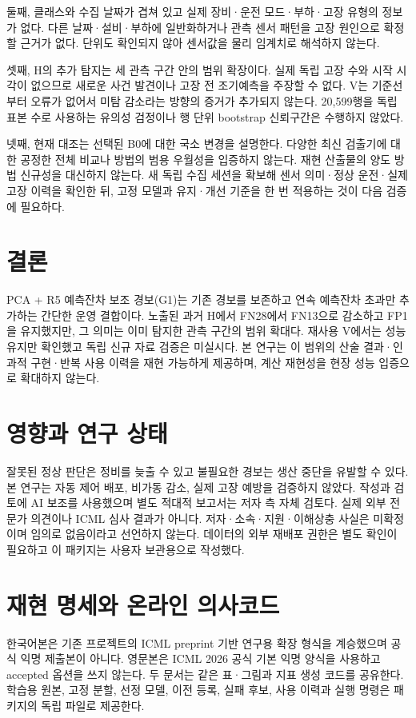\documentclass{article}
\begin{document}
둘째, 클래스와 수집 날짜가 겹쳐 있고 실제 장비·운전 모드·부하·고장 유형의 정보가 없다. 다른 날짜·설비·부하에 일반화하거나 관측 센서 패턴을 고장 원인으로 확정할 근거가 없다. 단위도 확인되지 않아 센서값을 물리 임계치로 해석하지 않는다.

셋째, H의 추가 탐지는 세 관측 구간 안의 범위 확장이다. 실제 독립 고장 수와 시작 시각이 없으므로 새로운 사건 발견이나 고장 전 조기예측을 주장할 수 없다. V는 기준선부터 오류가 없어서 미탐 감소라는 방향의 증거가 추가되지 않는다. 20,599행을 독립 표본 수로 사용하는 유의성 검정이나 행 단위 bootstrap 신뢰구간은 수행하지 않았다.

넷째, 현재 대조는 선택된 B0에 대한 국소 변경을 설명한다. 다양한 최신 검출기에 대한 공정한 전체 비교나 방법의 범용 우월성을 입증하지 않는다. 재현 산출물의 양도 방법 신규성을 대신하지 않는다. 새 독립 수집 세션을 확보해 센서 의미·정상 운전·실제 고장 이력을 확인한 뒤, 고정 모델과 유지·개선 기준을 한 번 적용하는 것이 다음 검증에 필요하다.

\section{결론}
PCA + R5 예측잔차 보조 경보(G1)는 기존 경보를 보존하고 연속 예측잔차 초과만 추가하는 간단한 운영 결합이다. 노출된 과거 H에서 FN28에서 FN13으로 감소하고 FP1을 유지했지만, 그 의미는 이미 탐지한 관측 구간의 범위 확대다. 재사용 V에서는 성능 유지만 확인했고 독립 신규 자료 검증은 미실시다. 본 연구는 이 범위의 산술 결과·인과적 구현·반복 사용 이력을 재현 가능하게 제공하며, 계산 재현성을 현장 성능 입증으로 확대하지 않는다.

\section*{영향과 연구 상태}
잘못된 정상 판단은 정비를 늦출 수 있고 불필요한 경보는 생산 중단을 유발할 수 있다. 본 연구는 자동 제어 배포, 비가동 감소, 실제 고장 예방을 검증하지 않았다. 작성과 검토에 AI 보조를 사용했으며 별도 적대적 보고서는 저자 측 자체 검토다. 실제 외부 전문가 의견이나 ICML 심사 결과가 아니다. 저자·소속·지원·이해상충 사실은 미확정이며 임의로 없음이라고 선언하지 않는다. 데이터의 외부 재배포 권한은 별도 확인이 필요하고 이 패키지는 사용자 보관용으로 작성했다.

\clearpage\appendix\onecolumn
\section{재현 명세와 온라인 의사코드}
한국어본은 기존 프로젝트의 ICML preprint 기반 연구용 확장 형식을 계승했으며 공식 익명 제출본이 아니다. 영문본은 ICML 2026 공식 기본 익명 양식을 사용하고 accepted 옵션을 쓰지 않는다. 두 문서는 같은 표·그림과 지표 생성 코드를 공유한다. 학습용 원본, 고정 분할, 선정 모델, 이전 등록, 실패 후보, 사용 이력과 실행 명령은 패키지의 독립 파일로 제공한다.
\end{document}
